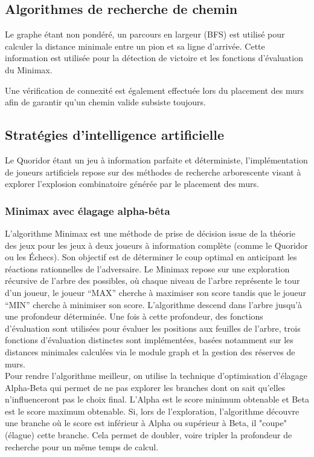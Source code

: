 \documentclass[a4paper]{article}
\begin{document}
\subsection{Algorithmes de recherche de chemin}

Le graphe étant non pondéré, un parcours en largeur (BFS) est utilisé pour calculer
la distance minimale entre un pion et sa ligne d'arrivée. Cette information est
utilisée pour la détection de victoire et les fonctions d'évaluation du Minimax.

Une vérification de connexité est également effectuée lors du placement des murs
afin de garantir qu'un chemin valide subsiste toujours.

\subsection{Stratégies d'intelligence artificielle}

Le Quoridor étant un jeu à information parfaite et déterministe, l'implémentation de joueurs artificiels repose sur des méthodes de recherche arborescente visant à explorer l'explosion combinatoire générée par le placement des murs.\cite{lloyd2022}

\subsubsection{Minimax avec élagage alpha-bêta}

L’algorithme Minimax est une méthode de prise de décision issue de la théorie des jeux pour les jeux à deux joueurs à information complète (comme le Quoridor ou les Échecs). Son objectif est de déterminer le coup optimal en anticipant les réactions rationnelles de l'adversaire. Le Minimax repose sur une exploration récursive de l’arbre des possibles, où chaque niveau de l'arbre représente le tour d'un joueur, le joueur “MAX” cherche à maximiser son score tandis que le joueur “MIN” cherche à minimiser son score. L’algorithme descend dans l’arbre jusqu’à une profondeur déterminée. Une fois à cette profondeur, des fonctions d’évaluation sont utilisées pour évaluer les positions aux feuilles de l'arbre, trois fonctions d'évaluation distinctes sont implémentées, basées notamment sur les distances minimales calculées via le module graph et la gestion des réserves de murs.\\
Pour rendre l’algorithme meilleur, on utilise la technique d’optimisation d’élagage Alpha-Beta qui permet de ne pas explorer les branches dont on sait qu’elles n’influenceront pas le choix final. L’Alpha est le score minimum obtenable et Beta est le score maximum obtenable. Si, lors de l'exploration, l'algorithme découvre une branche où le score est inférieur à Alpha ou supérieur à Beta, il "coupe" (élague) cette branche. Cela permet de doubler, voire tripler la profondeur de recherche pour un même temps de calcul.
\end{document}
